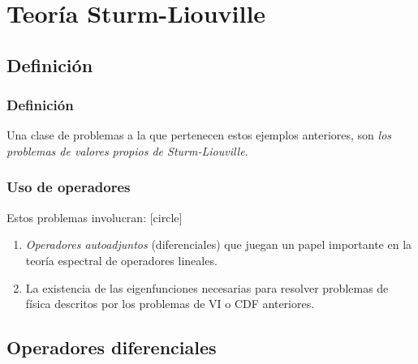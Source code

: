 \documentclass[12pt]{beamer}
\begin{document}
\section{Teoría Sturm-Liouville}
\subsection{Definición}

\begin{frame}
\frametitle{Definición}
Una clase de problemas a la que pertenecen estos ejemplos anteriores, son \emph{los problemas de valores propios de Sturm-Liouville}.
\end{frame}
\begin{frame}
\frametitle{Uso de operadores}
Estos problemas involucran:
[circle]
\begin{enumerate}[<+->]
\item \emph{Operadores autoadjuntos} (diferenciales) que juegan un papel importante en la teoría espectral de operadores lineales.
\item La existencia de las eigenfunciones necesarias para resolver problemas de física descritos por los problemas de VI o CDF anteriores.
\end{enumerate}
\end{frame}

\subsection{Operadores diferenciales}
\end{document}
